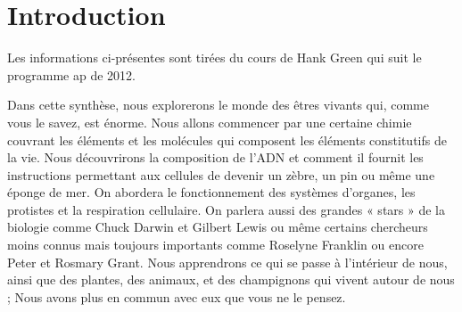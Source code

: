 \hypertarget{introduction}{%
\section{Introduction}\label{introduction}}

Les informations ci-présentes sont tirées du cours de Hank Green qui
suit le programme ap de 2012.

Dans cette synthèse, nous explorerons le monde des êtres vivants qui, comme vous le savez,
est énorme. Nous allons commencer par une certaine chimie couvrant les
éléments et les molécules qui composent les éléments constitutifs de la
vie. Nous découvrirons la composition de l'ADN et comment il fournit les
instructions permettant aux cellules de devenir un zèbre, un pin ou même
une éponge de mer. On abordera le fonctionnement des systèmes d'organes,
les protistes et la respiration cellulaire. On parlera aussi des grandes
« stars » de la biologie comme Chuck Darwin et Gilbert Lewis ou même
certains chercheurs moins connus mais toujours importants comme Roselyne
Franklin ou encore Peter et Rosmary Grant. Nous apprendrons ce qui se
passe à l'intérieur de nous, ainsi que des plantes, des animaux, et des
champignons qui vivent autour de nous ; Nous avons plus en commun avec
eux que vous ne le pensez.

